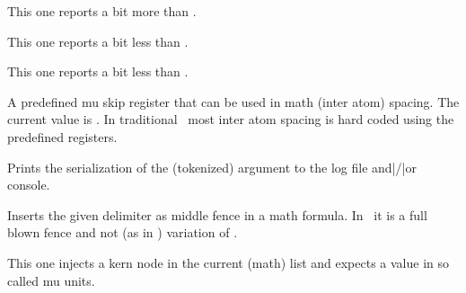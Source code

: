 \stopnewprimitive

\startnewprimitive[title={\prm {meaningfull}}]

This one reports a bit more than .

\startbuffer
\tolerant\permanent\protected\gdef\foo[#1]#*[#2]{(#1)(#2)} \meaningfull\foo
\stopbuffer

\typebuffer \getbuffer \let\gfoo\relax

\stopnewprimitive

\startnewprimitive[title={\prm {meaningles}}]

This one reports a bit less than .

\startbuffer
\tolerant\permanent\protected\gdef\foo[#1]#*[#2]{(#1)(#2)} \meaningles\foo
\stopbuffer

\typebuffer \getbuffer \let\gfoo\relax

\stopnewprimitive

\startnewprimitive[title={\prm {meaningless}}]

This one reports a bit less than .

\startbuffer
\tolerant\permanent\protected\gdef\foo[#1]#*[#2]{(#1)(#2)} \meaningless\foo
\stopbuffer

\typebuffer \getbuffer \let\gfoo\relax

\stopnewprimitive

\startoldprimitive[title={\prm {medmuskip}}]

A predefined mu skip register that can be used in math (inter atom) spacing. The
current value is {\tt \the\medmuskip}. In traditional \TEX\ most inter atom
spacing is hard coded using the predefined registers.

\stopoldprimitive

\startoldprimitive[title={\prm {message}}]

Prints the serialization of the (tokenized) argument to the log file and|/|or
console.

\stopoldprimitive

\startoldprimitive[title={\prm {middle}}]

Inserts the given delimiter as middle fence in a math formula. In \LUAMETATEX\ it
is a full blown fence and not (as in \ETEX) variation of .

\stopoldprimitive

\startoldprimitive[title={\prm {mkern}}]

This one injects a kern node in the current (math) list and expects a value in so
called mu units.

